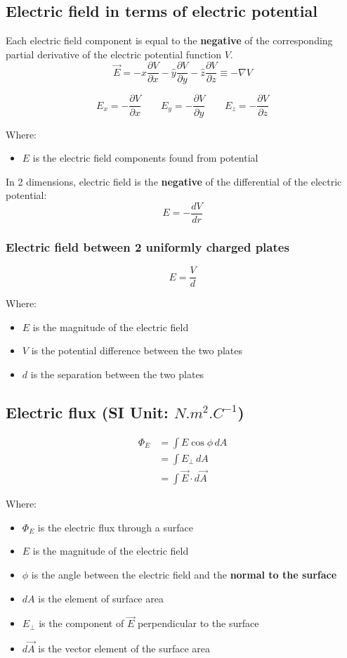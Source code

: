 \documentclass[11pt]{article}
\begin{document}
\subsection{Electric field in terms of electric potential}
\label{sec:org44c2cde}
Each electric field component is equal to the \textbf{negative} of the corresponding partial derivative of the electric potential function \(V\).
\[\vec{E} = - \hat{x} \frac{\partial V}{\partial x} - \hat{y} \frac{\partial V}{\partial y} - \hat{z} \frac{\partial V}{\partial z} \equiv - \nabla V\]

\[E_x = - \frac{\partial V}{\partial x} \qquad E_y = - \frac{\partial V}{\partial y} \qquad E_z = - \frac{\partial V}{\partial z}\]

Where:
\begin{itemize}
\item \(E\) is the electric field components found from potential
\end{itemize}

In 2 dimensions, electric field is the \textbf{negative} of the differential of the electric potential:
\[E = -\frac{dV}{dr}\]
\subsubsection{Electric field between 2 uniformly charged plates}
\label{sec:orgd4ee963}
\[E = \frac{V}{d}\]

Where:
\begin{itemize}
\item \(E\) is the magnitude of the electric field
\item \(V\) is the potential difference between the two plates
\item \(d\) is the separation between the two plates
\end{itemize}

\newpage
\subsection{Electric flux (SI Unit: \(\unit{N.m^2.C^{-1}}\))}
\label{sec:org409f2c8}
\begin{align*}
\Phi_E &= \int E \cos \phi \, dA \\
&= \int E_{\perp} \, dA \\
&= \int \vec{E} \cdot d \vec{A}
\end{align*}

Where:
\begin{itemize}
\item \(\Phi_E\) is the electric flux through a surface
\item \(E\) is the magnitude of the electric field
\item \(\phi\) is the angle between the electric field and the \textbf{normal to the surface}
\item \(dA\) is the element of surface area
\item \(E_{\perp}\) is the component of \(\vec{E}\) perpendicular to the surface
\item \(d \vec{A}\) is the vector element of the surface area
\end{itemize}
\end{document}
